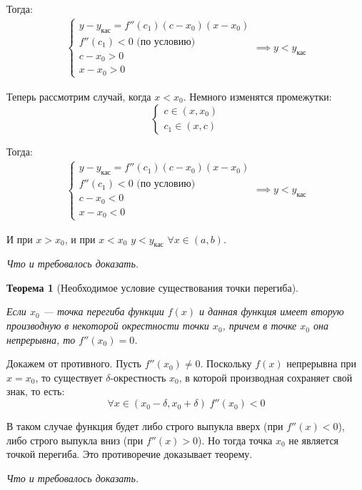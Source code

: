 \documentclass[a4paper,12pt,oneside]{extbook}
\newcommand{\newpar}{$ $\par\nobreak\ignorespaces}
\theoremstyle{numbered}
\theoremstyle{unnumbered}
\theoremstyle{named}
\newtheorem{theorem}{Теорема}[section]
\theoremstyle{unnumbered}
\theoremstyle{named}
\theoremstyle{named}
\theoremstyle{named}
\renewenvironment{proof}[1][]{\breakenv[Доказательство]{\if\relax\detokenize{#1}\relax\else\;\fi}{\textbf{#1}}}{\smallskip\newpar \hfill\textit{Что и требовалось доказать.}}
\begin{document}
\begin{proof}
    Тогда:
    \begin{gather*}
        \begin{cases}
            y - y_{\text{кас}} = f''(c_1)(c - x_0)(x - x_0) \\
            f''(c_1) < 0 \text{ (по условию)}               \\
            c - x_0 > 0                                     \\
            x - x_0 > 0
        \end{cases}
        \implies
        y < y_{\text{кас}}
    \end{gather*}

    Теперь рассмотрим случай, когда \(x < x_0\). Немного изменятся промежутки:
    \[
        \begin{cases}
            c \in (x, x_0) \\
            c_1 \in (x, c)
        \end{cases}
    \]

    Тогда:
    \begin{gather*}
        \begin{cases}
            y - y_{\text{кас}} = f''(c_1)(c - x_0)(x - x_0) \\
            f''(c_1) < 0 \text{ (по условию)}               \\
            c - x_0 < 0                                     \\
            x - x_0 < 0
        \end{cases}
        \implies
        y < y_{\text{кас}}
    \end{gather*}

    И при \(x > x_0\), и при \(x < x_0\) \(y < y_{\text{кас}}\) \(\forall x \in (a, b)\).
\end{proof}

\begin{theorem}[Необходимое условие существования точки перегиба]
    \newpar
    Если \(x_0\) — точка перегиба функции \(f(x)\) и данная функция имеет вторую производную в некоторой окрестности точки \(x_0\), причем в точке \(x_0\) она непрерывна, то \(f''(x_0) = 0\).
\end{theorem}

\begin{proof}
    Докажем от противного. Пусть \(f''(x_0) \neq 0\). Поскольку \(f(x)\) непрерывна при \(x = x_0\), то существует \(\delta\)-окрестность \(x_0\), в которой производная сохраняет свой знак, то есть:
    \[
        \forall x \in (x_0 - \delta, x_0 + \delta) \; f''(x_0) < 0
    \]

    В таком случае функция будет либо строго выпукла вверх (при \(f''(x) < 0\)), либо строго выпукла вниз (при \(f''(x) > 0\)). Но тогда точка \(x_0\) не является точкой перегиба. Это противоречие доказывает теорему.
\end{proof}
\end{document}
